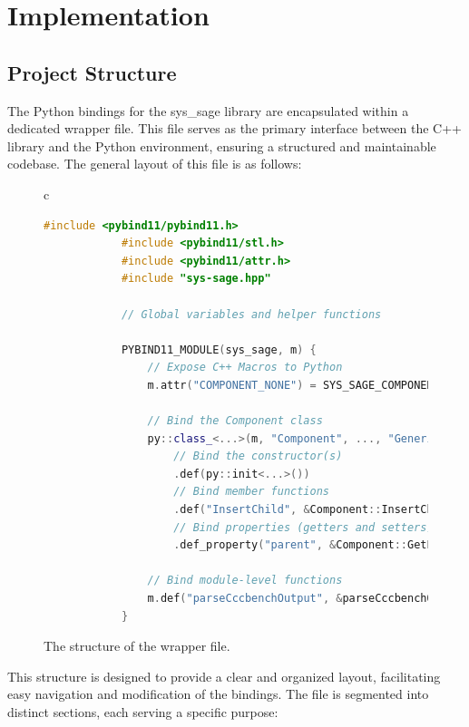 \chapter{Implementation}\label{chapter:Implementation}

\section{Project Structure}

The Python bindings for the sys\_sage library are encapsulated within a dedicated wrapper file. This file serves as the primary interface between the C++ library and the Python environment, ensuring a structured and maintainable codebase. The general layout of this file is as follows:
\begin{figure}[htpb]
    \centering
    \begin{tabular}{c}
        \begin{lstlisting}[language=C++]
            #include <pybind11/pybind11.h>
            #include <pybind11/stl.h>
            #include <pybind11/attr.h>
            #include "sys-sage.hpp"
            
            // Global variables and helper functions
            
            PYBIND11_MODULE(sys_sage, m) {
                // Expose C++ Macros to Python
                m.attr("COMPONENT_NONE") = SYS_SAGE_COMPONENT_NONE;
            
                // Bind the Component class
                py::class_<...>(m, "Component", ..., "Generic Component")
                    // Bind the constructor(s)
                    .def(py::init<...>())
                    // Bind member functions
                    .def("InsertChild", &Component::InsertChild, ...)
                    // Bind properties (getters and setters)
                    .def_property("parent", &Component::GetParent, &Component::SetParent, ...);
            
                // Bind module-level functions
                m.def("parseCccbenchOutput", &parseCccbenchOutput, ...);
            }
            \end{lstlisting}
    \end{tabular}
    \caption[Structure of the wrapper file]{The structure of the wrapper file.}\label{fig:wrapper-structure}
  \end{figure}


This structure is designed to provide a clear and organized layout, facilitating easy navigation and modification of the bindings. The file is segmented into distinct sections, each serving a specific purpose:

